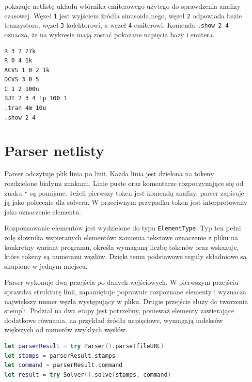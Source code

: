  pokazuje netlistę układu wtórnika emiterowego użytego do sprawdzenia analizy czasowej. Węzeł \texttt{1} jest wyjściem źródła sinusoidalnego, węzeł \texttt{2} odpowiada bazie tranzystora, węzeł \texttt{3} kolektorowi, a węzeł \texttt{4} emiterowi. Komenda \texttt{.show 2 4} oznacza, że na wykresie mają zostać pokazane napięcia bazy i emitera.

\begin{lstlisting}[language=Netlist,caption={Opis układu wtórnika emiterowego},label={lst:emitter-follower-netlist}]
R 3 2 27k
R 0 4 1k
ACVS 1 0 2 1k
DCVS 3 0 5
C 1 2 100n
BJT 2 3 4 1p 100 1
.tran 4m 10u
.show 2 4
\end{lstlisting}

\section{Parser netlisty}
\label{sec:parser-netlisty}

Parser odczytuje plik linia po linii. Każda linia jest dzielona na tokeny rozdzielone białymi znakami. Linie puste oraz komentarze rozpoczynające się od znaku \texttt{*} są pomijane. Jeżeli pierwszy token jest komendą analizy, parser zapisuje ją jako polecenie dla solvera. W przeciwnym przypadku token jest interpretowany jako oznaczenie elementu.

Rozpoznawanie elementów jest wydzielone do typu \texttt{ElementType}. Typ ten pełni rolę słownika wspieranych elementów: zamienia tekstowe oznaczenie z pliku na konkretny wariant programu, określa wymaganą liczbę tokenów oraz wskazuje, które tokeny są numerami węzłów. Dzięki temu podstawowe reguły składniowe są skupione w jednym miejscu.

Parser wykonuje dwa przejścia po danych wejściowych. W pierwszym przejściu sprawdza strukturę linii, zapamiętuje poprawnie rozpoznane elementy i wyznacza największy numer węzła występujący w pliku. Drugie przejście służy do tworzenia stempli. Podział na dwa etapy jest potrzebny, ponieważ elementy zawierające dodatkowe równania, na przykład źródła napięciowe, wymagają indeksów większych od numerów zwykłych węzłów.

\begin{lstlisting}[language=Swift,caption={Uproszczony schemat odpowiedzialności parsera},label={lst:parser-flow}]
let parserResult = try Parser().parse(fileURL)
let stamps = parserResult.stamps
let command = parserResult.command
let result = try Solver().solve(stamps, command)
\end{lstlisting}

